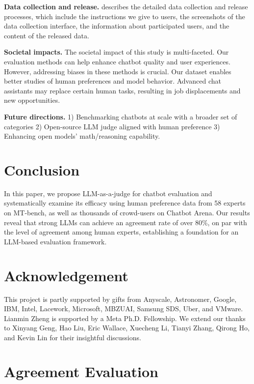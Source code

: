 \textbf{Data collection and release.}
 describes the detailed data collection and release processes, which include the instructions we give to users, the screenshots of the data collection interface, the information about participated users, and the content of the released data.

\textbf{Societal impacts.}
The societal impact of this study is multi-faceted. Our evaluation methods can help enhance chatbot quality and user experiences. However, addressing biases in these methods is crucial. Our dataset enables better studies of human preferences and model behavior. Advanced chat assistants may replace certain human tasks, resulting in job displacements and new opportunities.

\textbf{Future directions.}
1) Benchmarking chatbots at scale with a broader set of categories 2) Open-source LLM judge aligned with human preference 3) Enhancing open models' math/reasoning capability.

\section{Conclusion}
\label{sec:conclusion}
In this paper, we propose LLM-as-a-judge for chatbot evaluation and systematically examine its efficacy using human preference data from 58 experts on MT-bench, as well as thousands of crowd-users on Chatbot Arena.
Our results reveal that strong LLMs can achieve an agreement rate of over 80\%, on par with the level of agreement among human experts, establishing a foundation for an LLM-based evaluation framework.

\section*{Acknowledgement}
This project is partly supported by gifts from Anyscale, Astronomer, Google, IBM, Intel, Lacework, Microsoft, MBZUAI, Samsung SDS, Uber, and VMware. Lianmin Zheng is supported by a Meta Ph.D. Fellowship.
We extend our thanks to Xinyang Geng, Hao Liu, Eric Wallace, Xuecheng Li, Tianyi Zhang, Qirong Ho, and Kevin Lin for their insightful discussions.





\section{Agreement Evaluation}
\label{sec:agreement_eval}

